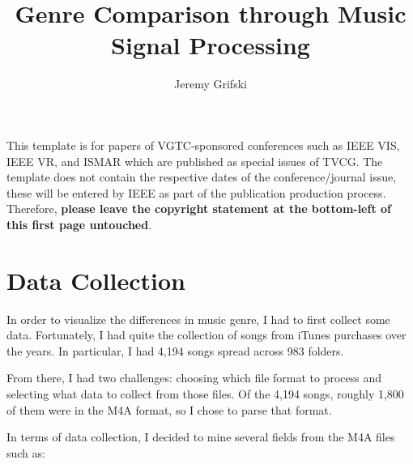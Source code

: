 \documentclass[journal]{vgtc}                %
\title{Genre Comparison through Music Signal Processing}
\author{Jeremy Grifski}
\begin{document}


\maketitle

This template is for papers of VGTC-sponsored conferences such as IEEE VIS, IEEE VR, and ISMAR which are published as special issues of TVCG. The template does not contain the respective dates of the conference/journal issue, these will be entered by IEEE as part of the publication production process. Therefore, \textbf{please leave the copyright statement at the bottom-left of this first page untouched}.

\section{Data Collection}

In order to visualize the differences in music genre, I had to first collect
some data. Fortunately, I had quite the collection of songs from iTunes purchases
over the years. In particular, I had 4,194 songs spread across 983 folders.

From there, I had two challenges: choosing which file format to process and
selecting what data to collect from those files. Of the 4,194 songs, roughly
1,800 of them were in the M4A format, so I chose to parse that format.

In terms of data collection, I decided to mine several fields from the M4A files
such as:
\end{document}

